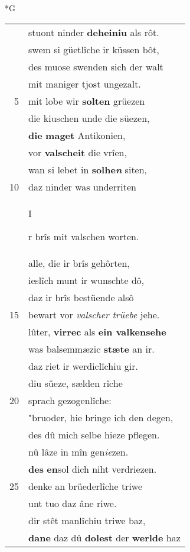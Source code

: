 \documentclass[8pt,a4paper,notitlepage]{article}
\begin{document}
\begin{table}[ht]
\begin{minipage}[t]{0.5\linewidth}
\small
\begin{center}*G
\end{center}
\begin{tabular}{rl}
 & stuont ninder \textbf{deheiniu} als rôt.\\ 
 & swem si güetlîche ir küssen bôt,\\ 
 & des muose swenden sich der walt\\ 
 & mit maniger tjost ungezalt.\\ 
5 & mit lobe wir \textbf{solten} grüezen\\ 
 & die kiuschen unde die süezen,\\ 
 & \textbf{die} \textbf{maget} Antikonien,\\ 
 & vor \textbf{valscheit} die vrîen,\\ 
 & wan si lebet in \textbf{solhe\textit{n}} siten,\\ 
10 & daz ninder was underriten\\ 
 & \begin{large}I\end{large}r brîs mit valschen worten.\\ 
 & alle, die ir brîs gehôrten,\\ 
 & ieslîch munt ir wunschte dô,\\ 
 & daz ir brîs bestüende alsô\\ 
15 & bewart vor \textit{valscher trüebe} jehe.\\ 
 & lûter, \textbf{virrec} als \textbf{ein valkensehe}\\ 
 & was balsemmæzic \textbf{stæte} an ir.\\ 
 & daz riet ir werdiclîchiu gir.\\ 
 & diu süeze, sælden rîche\\ 
20 & sprach gezogenlîche:\\ 
 & "bruoder, hie bringe ich den degen,\\ 
 & des dû mich selbe hieze pflegen.\\ 
 & nû lâze in mîn gen\textit{ie}zen.\\ 
 & \textbf{des} \textbf{en}sol dich niht verdriezen.\\ 
25 & denke an brüederlîche triwe\\ 
 & unt tuo daz âne riwe.\\ 
 & dir stêt manlîchiu triwe baz,\\ 
 & \textbf{dane} daz dû \textbf{dolest} der \textbf{werlde} haz\\ 

\end{tabular}
\end{minipage}
\end{table}
\end{document}
